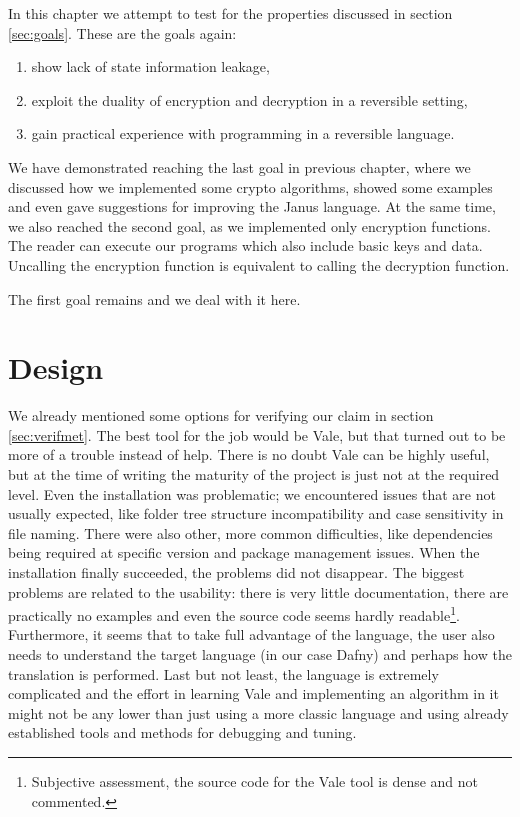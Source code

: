 \documentclass[a4paper,10pt,openright]{memoir}
\begin{document}
In this chapter we attempt to test for the properties discussed in 
section \ref{sec:goals}. These are the goals again:

\begin{enumerate}
\item show lack of state information leakage,
\item exploit the duality of encryption and decryption in a reversible setting,
\item gain practical experience with programming in a reversible language.
\end{enumerate}

We have demonstrated reaching the last goal in previous chapter, where 
we discussed how we implemented some crypto algorithms, showed some 
examples and even gave suggestions for improving the Janus language. At 
the same time, we also reached the second goal, as we implemented only 
encryption functions. The reader can execute our programs which also 
include basic keys and data. Uncalling the encryption function is 
equivalent to calling the decryption function.

The first goal remains and we deal with it here.

\section{Design}

We already mentioned some options for verifying our claim in section 
\ref{sec:verifmet}. The best tool for the job would be Vale, but that 
turned out to be more of a trouble instead of help. There is no doubt 
Vale can be highly useful, but at the time of writing the maturity of 
the project is just not at the required level. Even the installation 
was problematic; we encountered issues that are not usually expected, 
like folder tree structure incompatibility and case sensitivity in file 
naming. There were also other, more common difficulties, like 
dependencies being required at specific version and package management 
issues. When the installation finally succeeded, the problems did not 
disappear. The biggest problems are related to the usability: there is 
very little documentation, there are practically no examples and even 
the source code seems hardly readable\footnote{Subjective assessment, 
the source code for the Vale tool is dense and not commented.}. 
Furthermore, it seems that to take full advantage of the language, the 
user also needs to understand the target language (in our case Dafny) 
and perhaps how the translation is performed. Last but not least, the 
language is extremely complicated and the effort in learning Vale and 
implementing an algorithm in it might not be any lower than just using 
a more classic language and using already established tools and methods 
for debugging and tuning.
\end{document}
